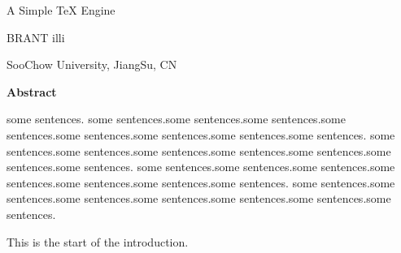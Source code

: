 \centerline{\bigrm A Simple TeX Engine}
\bigskip

\centerline{BRANT illi}
\smallskip
\centerline{SooChow University, JiangSu, CN}

\bigskip


\centerline{\bf Abstract}
\smallskip
    some sentences. some sentences.some sentences.some sentences.some sentences.some sentences.some sentences.some sentences.some sentences.
    some sentences.some sentences.some sentences.some sentences.some sentences.some sentences.some sentences.
    some sentences.some sentences.some sentences.some sentences.some sentences.some sentences.some sentences.
    some sentences.some sentences.some sentences.some sentences.some sentences.some sentences.some sentences.

\bigskip


This is the start of the introduction.

